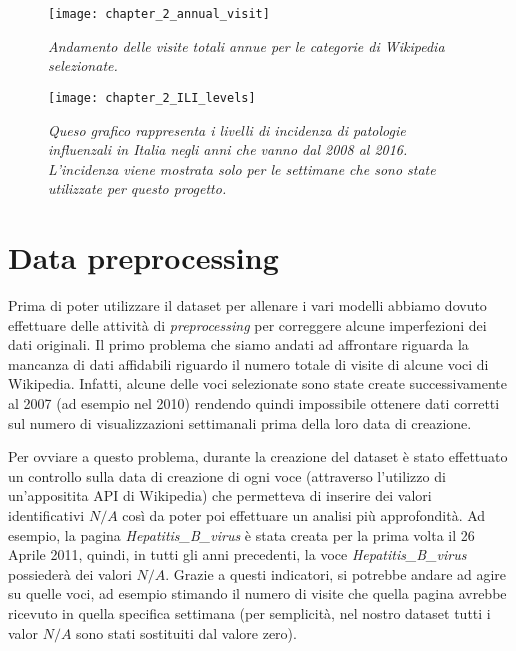 \begin{figure}[h]

\texttt{[image: chapter\_2\_annual\_visit]}
\caption{\textit{Andamento delle visite totali annue per le categorie di Wikipedia selezionate.}}
\label{fig:ch_2_annual_visit}

\vspace{10px}

\texttt{[image: chapter\_2\_ILI\_levels]}
\caption{\textit{Queso grafico rappresenta i livelli di incidenza di patologie influenzali in Italia negli anni che vanno dal 2008 al 2016. L'incidenza viene mostrata solo per le settimane che sono state utilizzate per questo progetto.}}
\label{fig:ch_2_ILI_levels}

\centering

\end{figure}
\bigskip

\section{Data preprocessing}
\bigskip

Prima di poter utilizzare il dataset per allenare i vari modelli abbiamo dovuto effettuare delle attività di 
\textit{preprocessing} per correggere alcune imperfezioni dei dati originali. Il primo problema che siamo andati ad 
affrontare riguarda la mancanza di dati affidabili riguardo il numero totale di visite di alcune voci di Wikipedia.
Infatti, alcune delle voci selezionate sono state create successivamente al 2007 (ad esempio nel 2010) rendendo quindi 
impossibile ottenere dati corretti sul numero di visualizzazioni settimanali prima della loro data di creazione. 
\bigskip

Per ovviare a questo problema, durante la creazione del dataset è stato effettuato un controllo sulla data di creazione di 
ogni voce (attraverso l'utilizzo di un'appositita API di Wikipedia) che permetteva di inserire dei valori identificativi $N/A
$ così da poter poi effettuare un analisi più approfondità. Ad esempio, la pagina \textit{Hepatitis_B_virus} è stata creata 
per la prima volta il 26 Aprile 2011, quindi, in tutti gli anni precedenti, la voce \textit{Hepatitis_B_virus} possiederà dei 
valori $N/A$. Grazie a questi indicatori, si potrebbe andare ad agire su quelle voci, ad esempio stimando il numero di visite 
che quella pagina avrebbe ricevuto in quella specifica settimana (per semplicità, nel nostro dataset tutti i valor $N/A$ sono 
stati sostituiti dal valore zero).
\bigskip


